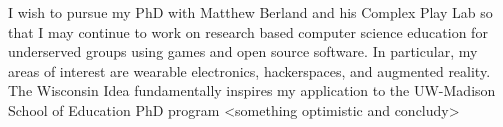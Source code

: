 \documentclass[12pt]{letter}
\begin{document}
\begin{letter}
I wish to pursue my PhD with Matthew Berland and his Complex Play Lab so that I may continue to work on research based computer science education for underserved groups using games and open source software. In particular, my areas of interest are wearable electronics, hackerspaces, and augmented reality. The Wisconsin Idea fundamentally inspires my application to the UW-Madison School of Education PhD program <something optimistic and concludy>





\end{letter}
\end{document}
